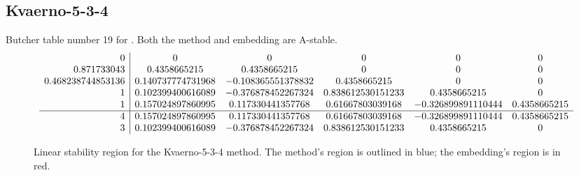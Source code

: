 \documentclass[letterpaper,10pt,english]{sphinxmanual}
\begin{document}
\subsection{Kvaerno-5-3-4}
\label{Butcher:kvaerno-5-3-4}\label{Butcher:butcher-kvaerno-5-3-4}
Butcher table number 19
for {\hyperref[c_interface/User_callable:ARKodeSetIRKTableNum]{}}.  Both the
method and embedding are A-stable.
\begin{gather}
\begin{split}\begin{array}{r|ccccc}
  0 & 0 & 0 & 0 & 0 & 0 \\
  0.871733043 & 0.4358665215  & 0.4358665215  & 0 & 0 & 0 \\
  0.468238744853136 & 0.140737774731968 & -0.108365551378832 & 0.4358665215 & 0 & 0 \\
  1 & 0.102399400616089 & -0.376878452267324 & 0.838612530151233 & 0.4358665215 & 0 \\
  1 & 0.157024897860995 & 0.117330441357768 & 0.61667803039168 & -0.326899891110444 & 0.4358665215 \\
  \hline
  4 & 0.157024897860995 & 0.117330441357768 & 0.61667803039168 & -0.326899891110444 & 0.4358665215 \\
  3 & 0.102399400616089 & -0.376878452267324 & 0.838612530151233 & 0.4358665215 & 0
\end{array}\end{split}\notag
\end{gather}\begin{figure}[htbp]
\centering
\capstart

\caption{Linear stability region for the Kvaerno-5-3-4 method.  The method's
region is outlined in blue; the embedding's region is in red.}\end{figure}
\end{document}
